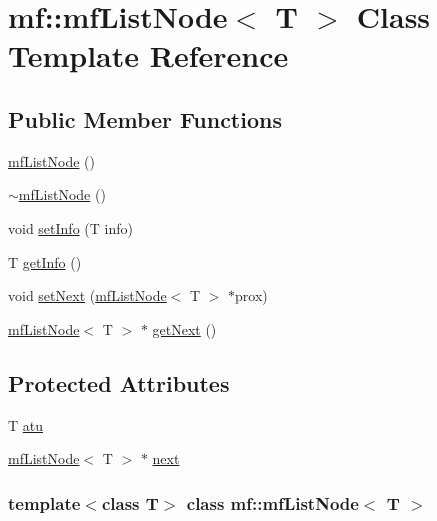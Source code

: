 \hypertarget{classmf_1_1mfListNode}{
\section{mf::mfListNode$<$ T $>$ Class Template Reference}
\label{classmf_1_1mfListNode}
}
\subsection*{Public Member Functions}
\begin{DoxyCompactItemize}
\item 
\hyperlink{classmf_1_1mfListNode_a8e7194be5a049c9c419b22725796b9a2}{mfListNode} ()
\item 
\hyperlink{classmf_1_1mfListNode_a62e617b5be77e75edd512f320b7afdba}{$\sim$mfListNode} ()
\item 
void \hyperlink{classmf_1_1mfListNode_a9d37bfc76d67620e5425d585ae991804}{setInfo} (T info)
\item 
T \hyperlink{classmf_1_1mfListNode_a9d770f3d8081ea73457ff0d01e4190a0}{getInfo} ()
\item 
void \hyperlink{classmf_1_1mfListNode_a381704a174067d21a23013d2e0135eb5}{setNext} (\hyperlink{classmf_1_1mfListNode}{mfListNode}$<$ T $>$ $\ast$prox)
\item 
\hyperlink{classmf_1_1mfListNode}{mfListNode}$<$ T $>$ $\ast$ \hyperlink{classmf_1_1mfListNode_af1213e72ebdad902ab6b330fe826481f}{getNext} ()
\end{DoxyCompactItemize}
\subsection*{Protected Attributes}
\begin{DoxyCompactItemize}
\item 
T \hyperlink{classmf_1_1mfListNode_a8eb4bb13617418b9e6a8772083b6e9b2}{atu}
\item 
\hyperlink{classmf_1_1mfListNode}{mfListNode}$<$ T $>$ $\ast$ \hyperlink{classmf_1_1mfListNode_a7e6106867fa0d2056dded7efaf3919c8}{next}
\end{DoxyCompactItemize}
\subsubsection*{template$<$class T$>$ class mf::mfListNode$<$ T $>$}



